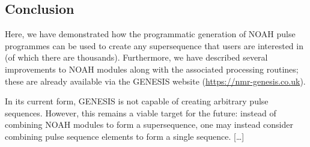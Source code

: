 \documentclass[a4paper,11pt]{article}
\newcommand{\todo}[1]{\textcolor{WildStrawberry}{#1}}
\newcommand{\theurl}{\url{https://nmr-genesis.co.uk}}
\begin{document}
\begin{refsection}
\section{Conclusion}

Here, we have demonstrated how the programmatic generation of NOAH pulse programmes can be used to create any supersequence that users are interested in (of which there are thousands).
Furthermore, we have described several improvements to NOAH modules along with the associated processing routines; these are already available via the GENESIS website (\theurl{}).

\todo{
    In its current form, GENESIS is not capable of creating arbitrary pulse sequences.
    However, this remains a viable target for the future: instead of combining NOAH modules to form a supersequence, one may instead consider combining pulse sequence elements to form a single sequence.
    [\ldots]
}

\printbibliography{}
\end{refsection}
\end{document}
